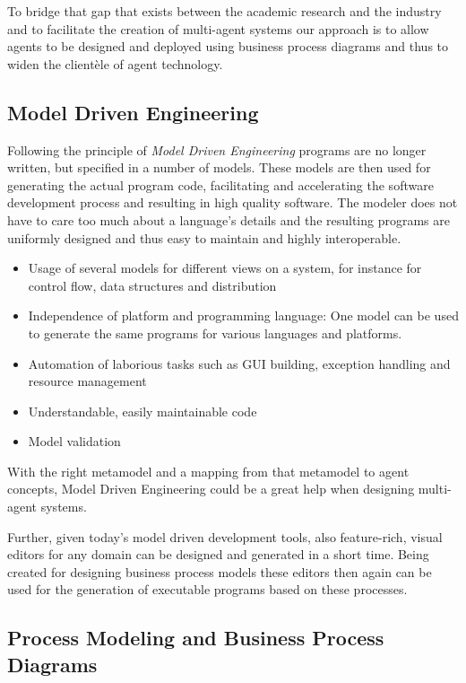 To bridge that gap that exists between the academic research and the industry and to facilitate the creation of multi-agent systems our approach is to allow agents to be designed and deployed using business process diagrams and thus to widen the clientèle of agent technology.


\subsection{Model Driven Engineering}
Following the principle of \emph{Model Driven Engineering} programs are no longer written, but specified in a number of models. These models are then used for generating the actual program code, facilitating and accelerating the software development process and resulting in high quality software. The modeler does not have to care too much about a language's details and the resulting programs are uniformly designed and thus easy to maintain and highly interoperable.

\begin{itemize}
	\item Usage of several models for different views on a system, for instance for control flow, data structures and distribution
	\item Independence of platform and programming language: One model can be used to generate the same programs for various languages and platforms.
	\item Automation of laborious tasks such as GUI building, exception handling and resource management
	\item Understandable, easily maintainable code
	\item Model validation
\end{itemize}

With the right metamodel and a mapping from that metamodel to agent concepts, Model Driven Engineering could be a great help when designing multi-agent systems.

Further, given today's model driven development tools, also feature-rich, visual editors for any domain can be designed and generated in a short time. Being created for designing business process models these editors then again can be used for the generation of executable programs based on these processes.


\subsection{Process Modeling and Business Process Diagrams}

